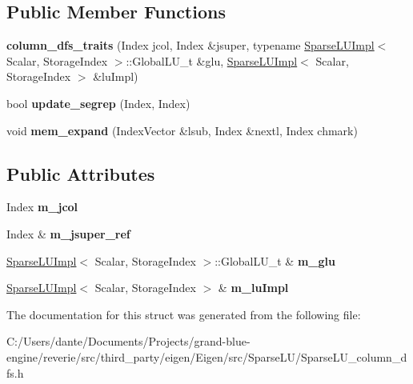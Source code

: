 \subsection*{Public Member Functions}
\begin{DoxyCompactItemize}
\item 
\mbox{\label{struct_eigen_1_1internal_1_1column__dfs__traits_a84be35a20707d05cdf72d18e7755ae96}} 
{\bfseries column\+\_\+dfs\+\_\+traits} (Index jcol, Index \&jsuper, typename \mbox{\hyperlink{class_eigen_1_1internal_1_1_sparse_l_u_impl}{Sparse\+L\+U\+Impl}}$<$ Scalar, Storage\+Index $>$\+::Global\+L\+U\+\_\+t \&glu, \mbox{\hyperlink{class_eigen_1_1internal_1_1_sparse_l_u_impl}{Sparse\+L\+U\+Impl}}$<$ Scalar, Storage\+Index $>$ \&lu\+Impl)
\item 
\mbox{\label{struct_eigen_1_1internal_1_1column__dfs__traits_a034a1bf7ad2d7a4ba7e8c91463dc3f36}} 
bool {\bfseries update\+\_\+segrep} (Index, Index)
\item 
\mbox{\label{struct_eigen_1_1internal_1_1column__dfs__traits_a5b48ce6fa5fa373fd784033df70959ff}} 
void {\bfseries mem\+\_\+expand} (Index\+Vector \&lsub, Index \&nextl, Index chmark)
\end{DoxyCompactItemize}
\subsection*{Public Attributes}
\begin{DoxyCompactItemize}
\item 
\mbox{\label{struct_eigen_1_1internal_1_1column__dfs__traits_aeb425429d726efde9a63eea217549a0d}} 
Index {\bfseries m\+\_\+jcol}
\item 
\mbox{\label{struct_eigen_1_1internal_1_1column__dfs__traits_a899dbc434353f1d05b512169a2f57e87}} 
Index \& {\bfseries m\+\_\+jsuper\+\_\+ref}
\item 
\mbox{\label{struct_eigen_1_1internal_1_1column__dfs__traits_a8a373ddef6de2fd2462c06534a052118}} 
\mbox{\hyperlink{class_eigen_1_1internal_1_1_sparse_l_u_impl}{Sparse\+L\+U\+Impl}}$<$ Scalar, Storage\+Index $>$\+::Global\+L\+U\+\_\+t \& {\bfseries m\+\_\+glu}
\item 
\mbox{\label{struct_eigen_1_1internal_1_1column__dfs__traits_a0bfbf67afd5463fd9b10fc6d9bcefedb}} 
\mbox{\hyperlink{class_eigen_1_1internal_1_1_sparse_l_u_impl}{Sparse\+L\+U\+Impl}}$<$ Scalar, Storage\+Index $>$ \& {\bfseries m\+\_\+lu\+Impl}
\end{DoxyCompactItemize}


The documentation for this struct was generated from the following file\+:\begin{DoxyCompactItemize}
\item 
C\+:/\+Users/dante/\+Documents/\+Projects/grand-\/blue-\/engine/reverie/src/third\+\_\+party/eigen/\+Eigen/src/\+Sparse\+L\+U/Sparse\+L\+U\+\_\+column\+\_\+dfs.\+h\end{DoxyCompactItemize}
